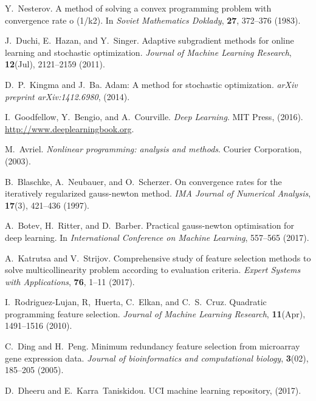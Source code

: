 \documentclass[
11pt,%
tightenlines,%
twoside,%
onecolumn,%
nofloats,%
nobibnotes,%
nofootinbib,%
superscriptaddress,%
noshowpacs,%
centertags]%
{revtex4}
\begin{document}
\begin{thebibliography}{10}
	
	Y.~Nesterov. A method of solving a convex programming problem with convergence
	rate o (1/k2). 
	In {\em Soviet Mathematics Doklady}, \textbf{27}, 372--376 (1983).
	
	J.~Duchi, E.~Hazan, and Y.~Singer.
	Adaptive subgradient methods for online learning and stochastic
	optimization.
	{\em Journal of Machine Learning Research}, \textbf{12}(Jul), 2121--2159 (2011).
	
	D.~P.~Kingma and J.~Ba.
	Adam: A method for stochastic optimization.
	{\em arXiv preprint arXiv:1412.6980}, (2014).
	
	I.~Goodfellow, Y.~Bengio, and A.~Courville.
	{\em Deep Learning}.
	MIT Press, (2016).
	\url{http://www.deeplearningbook.org}.
	
	M.~Avriel.
	{\em Nonlinear programming: analysis and methods}.
	Courier Corporation, (2003).
	
	B.~Blaschke, A.~Neubauer, and O.~Scherzer.
	On convergence rates for the iteratively regularized gauss-newton
	method.
	{\em IMA Journal of Numerical Analysis}, \textbf{17}(3), 421--436 (1997).
	
	A.~Botev, H.~Ritter, and D.~Barber.
	Practical gauss-newton optimisation for deep learning.
	In {\em International Conference on Machine Learning},
	557--565 (2017).
	
	A.~Katrutsa and V.~Strijov.
	Comprehensive study of feature selection methods to solve
	multicollinearity problem according to evaluation criteria.
	{\em Expert Systems with Applications}, \textbf{76}, 1--11 (2017).
	
	I.~Rodriguez-Lujan, R,~Huerta, C.~Elkan, and C.~S.~Cruz.
	Quadratic programming feature selection.
	{\em Journal of Machine Learning Research}, \textbf{11}(Apr), 1491--1516 (2010).
	
	C.~Ding and H.~Peng.
	Minimum redundancy feature selection from microarray gene expression
	data.
	{\em Journal of bioinformatics and computational biology},
	\textbf{3}(02), 185--205 (2005).
	
	D.~Dheeru and E.~Karra~Taniskidou.
	{UCI} machine learning repository, (2017).
	
\end{thebibliography}
\end{document}
